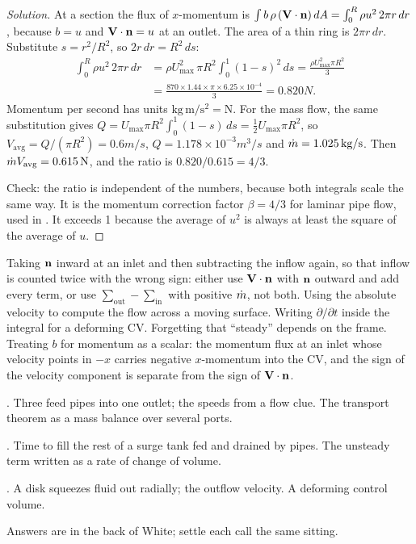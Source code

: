 \begin{proof}[Solution]
At a section the flux of $x$-momentum is $\int b\,\rho\, (\mathbf{V}\cdot\mathbf{n})\,dA = \int_0^R \rho u^2\, 2\pi r\, dr$, because $b = u$ and $\mathbf{V}\cdot\mathbf{n} = u$ at an outlet. The area of a thin ring is $2\pi r\,dr$. Substitute $s = r^2/R^2$, so $2r\,dr = R^2\,ds$:
\begin{align*}
\int_0^R \rho u^2\, 2\pi r\, dr &= \rho U_\text{max}^2\, \pi R^2 \int_0^1 (1-s)^2\, ds = \frac{\rho U_\text{max}^2\pi R^2}{3}\\
&= \frac{870\times 1.44\times \pi\times 6.25\times10^{-4}}{3} = 0.820\unit{N}.
\end{align*}
Momentum per second has units $\mathrm{kg\,m/s^2} = \mathrm{N}$. For the mass flow, the same substitution gives $Q = U_\text{max}\pi R^2\int_0^1(1-s)\,ds = \tfrac12 U_\text{max}\pi R^2$, so $V_\text{avg} = Q/(\pi R^2) = 0.6\unit{m/s}$, $Q = 1.178\times10^{-3}\unit{m^3/s}$ and $\dot m = 1.025\,\mathrm{kg/s}$. Then $\dot m V_\text{avg} = 0.615\,\mathrm{N}$, and the ratio is $0.820/0.615 = 4/3$.

Check: the ratio is independent of the numbers, because both integrals scale the same way. It is the momentum correction factor $\beta = 4/3$ for laminar pipe flow, used in . It exceeds 1 because the average of $u^2$ is always at least the square of the average of $u$.
\end{proof}

\begin{trap}
Taking $\mathbf{n}$ inward at an inlet and then subtracting the inflow again, so that inflow is counted twice with the wrong sign: either use $\mathbf{V}\cdot\mathbf{n}$ with $\mathbf{n}$ outward and add every term, or use $\sum_\text{out} - \sum_\text{in}$ with positive $\dot m$, not both. Using the absolute velocity to compute the flow across a moving surface. Writing $\partial/\partial t$ inside the integral for a deforming CV. Forgetting that ``steady'' depends on the frame. Treating $b$ for momentum as a scalar: the momentum flux at an inlet whose velocity points in $-x$ carries negative $x$-momentum into the CV, and the sign of the velocity component is separate from the sign of $\mathbf{V}\cdot\mathbf{n}$.
\end{trap}

\begin{ladder}
\item {}. Three feed pipes into one outlet; the speeds from a flow clue. The transport theorem as a mass balance over several ports.
\item {}. Time to fill the rest of a surge tank fed and drained by pipes. The unsteady term written as a rate of change of volume.
\item {}. A disk squeezes fluid out radially; the outflow velocity. A deforming control volume.
\end{ladder}
Answers are in the back of White; settle each call the same sitting.


